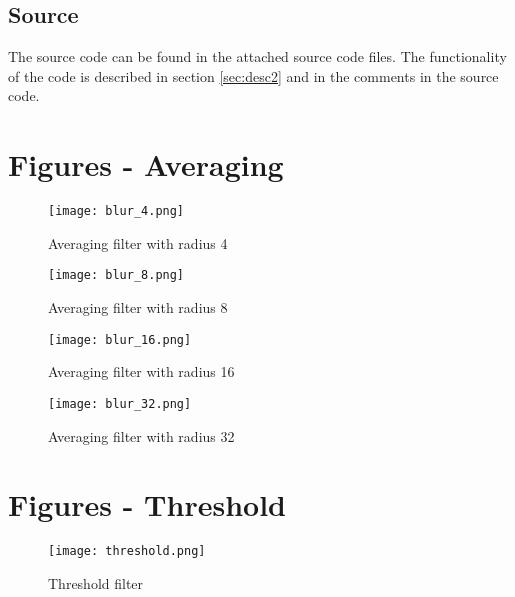 \documentclass[a4paper, 12pt]{article}
\begin{document}
\subsection{Source}

The source code can be found in the attached source code files.
The functionality of the code is described in section \ref{sec:desc2} and in the
comments in the source code.

\newpage
\appendix
\section{Figures - Averaging}
\label{sec:fig_aver}

\begin{figure}[hb]
        \centering
        \texttt{[image: blur\_4.png]}
        \caption{Averaging filter with radius 4}
        \label{fig:blur_4}
\end{figure}
\begin{figure}[hb]
        \centering
        \texttt{[image: blur\_8.png]}
        \caption{Averaging filter with radius 8}
        \label{fig:blur_8}
\end{figure}
\begin{figure}[hb]
        \centering
        \texttt{[image: blur\_16.png]}
        \caption{Averaging filter with radius 16}
        \label{fig:blur_16}
\end{figure}
\begin{figure}[hb]
        \centering
        \texttt{[image: blur\_32.png]}
        \caption{Averaging filter with radius 32}
        \label{fig:blur_32}
\end{figure}
\clearpage
\section{Figures - Threshold}
\label{sec:fig_thres}

\begin{figure}[h]
        \centering
        \texttt{[image: threshold.png]}
        \caption{Threshold filter}
        \label{fig:thres}
\end{figure}
\end{document}
